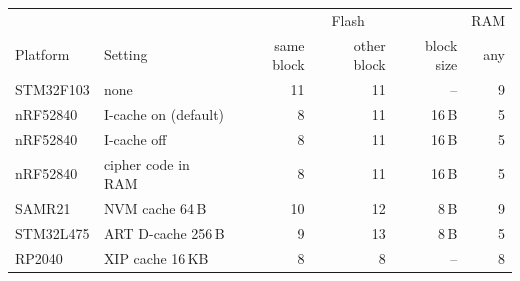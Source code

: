 \begin{tabular}{llrrrr}
\hline
 & & \multicolumn{3}{c}{Flash} & RAM\\
Platform & Setting & same block & other block & block size & any\\
\hline
STM32F103 & none & 11 & 11 & -- & 9\\
nRF52840 & I-cache on (default) & 8 & 11 & 16\,B & 5\\
nRF52840 & I-cache off & 8 & 11 & 16\,B & 5\\
nRF52840 & cipher code in RAM & 8 & 11 & 16\,B & 5\\
SAMR21 & NVM cache 64\,B & 10 & 12 & 8\,B & 9\\
STM32L475 & ART D-cache 256\,B & 9 & 13 & 8\,B & 5\\
RP2040 & XIP cache 16\,KB & 8 & 8 & -- & 8\\
\hline
\end{tabular}
